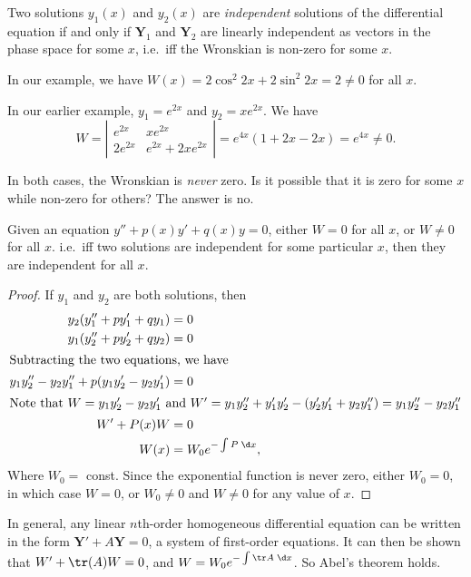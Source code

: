 \documentclass[a4paper]{article}
\begin{document}
\begin{defi}
  Two solutions $y_1(x)$ and $y_2(x)$ are \emph{independent} solutions of the differential equation if and only if $\mathbf{Y}_1$ and $\mathbf{Y}_2$ are linearly independent as vectors in the phase space for some $x$, i.e.\ iff the Wronskian is non-zero for some $x$.
\end{defi}

In our example, we have $W(x) = 2\cos^2 2x + 2\sin^2 2x = 2 \not= 0$ for all $x$.

\begin{eg}
  In our earlier example, $y_1 = e^{2x}$ and $y_2 = xe^{2x}$. We have
  \[
    W = \left|\begin{matrix} e^{2x} & xe^{2x}\\ 2e^{2x} & e^{2x} + 2xe^{2x} \end{matrix}\right| = e^{4x}(1 + 2x - 2x) = e^{4x} \not= 0.
  \]
\end{eg}

In both cases, the Wronskian is \emph{never} zero. Is it possible that it is zero for some $x$ while non-zero for others? The answer is no.

\begin{thm}
  Given an equation $y'' + p(x)y' + q(x) y = 0$, either $W = 0$ for all $x$, or $W \not= 0$ for all $x$. i.e.\ iff two solutions are independent for some particular $x$, then they are independent for all $x$.
\end{thm}

\begin{proof}
  If $y_1$ and $y_2$ are both solutions, then
  \begin{align*}
    y_2(y_1'' + py_1' + qy_1) &= 0\\
    y_1(y_2'' + py_2' + qy_2) &= 0\\
    \intertext{Subtracting the two equations, we have}
    y_1y_2'' - y_2y_1'' + p(y_1y_2' - y_2y_1') &= 0\\
    \intertext{Note that $W =y_1y_2' - y_2y_1'$ and $W' = y_1y_2'' + y_1'y_2' - (y_2'y_1' + y_2y_1'') = y_1y_2'' - y_2y_1''$}
    W' + P(x)W &= 0\\
    W(x) &= W_0 e^{-\int P\; \d x},
  \end{align*}
  Where $W_0 = $ const. Since the exponential function is never zero, either $W_0 = 0$, in which case $W = 0$, or $W_0 \not= 0$ and $W \not= 0$ for any value of $x$.
\end{proof}
In general, any linear $n$th-order homogeneous differential equation can be written in the form $\mathbf{Y}' + A\mathbf{Y} = 0$, a system of first-order equations. It can then be shown that $W' + \tr(A)W = 0$, and $W = W_0e^{-\int \tr A\;\d x}$. So Abel's theorem holds.
\end{document}
